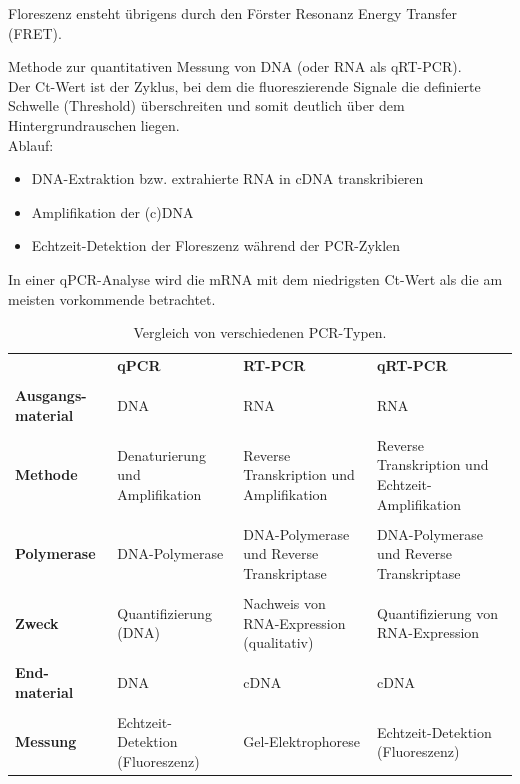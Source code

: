 \noindent Floreszenz ensteht übrigens durch den Förster Resonanz Energy Transfer (FRET). 
\begin{mechanism}[title=Wie funktioniert qPCR\, was ist der Ct-Wert und welche mRNA liegt am meisten vor?]
Methode zur quantitativen Messung von DNA (oder RNA als qRT-PCR). \\ Der Ct-Wert ist der Zyklus, bei dem die fluoreszierende Signale die definierte Schwelle (Threshold) überschreiten und somit deutlich über dem Hintergrundrauschen liegen. \\
Ablauf: 
\begin{itemize}
    \item DNA-Extraktion bzw. extrahierte RNA in cDNA transkribieren 
    \item Amplifikation der (c)DNA
    \item Echtzeit-Detektion der Floreszenz während der PCR-Zyklen 
\end{itemize}
In einer qPCR-Analyse wird die mRNA mit dem niedrigsten Ct-Wert als die am meisten vorkommende betrachtet. 
\end{mechanism} 
 
\begin{table}[H] %
    \centering
    \begin{tabular}{p{2cm}p{4cm}p{4cm}p{4cm}}
       &  \textbf{qPCR} & \textbf{RT-PCR} & \textbf{qRT-PCR} \\ \\
    \textbf{Ausgangs-material} & DNA & RNA & RNA \\ \\
    \textbf{Methode} & Denaturierung und Amplifikation & Reverse Transkription und Amplifikation & Reverse Transkription und Echtzeit-Amplifikation \\  \\
    \textbf{Polymerase} &  	DNA-Polymerase &  	DNA-Polymerase und Reverse Transkriptase & DNA-Polymerase und Reverse Transkriptase \\ \\
    \textbf{Zweck} & Quantifizierung (DNA) & Nachweis von RNA-Expression (qualitativ) & Quantifizierung von RNA-Expression \\ \\
    \textbf{End-material}& DNA & cDNA & cDNA  \\ \\
    \textbf{Messung} & Echtzeit-Detektion (Fluoreszenz) & Gel-Elektrophorese & Echtzeit-Detektion (Fluoreszenz)
    \end{tabular}
    \caption{Vergleich von verschiedenen PCR-Typen.}
    \label{tab:pcrtypen}
\end{table}
